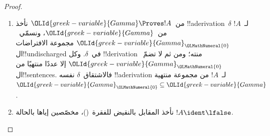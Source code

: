 \documentclass[../../../include/open-logic-section]{subfiles}
\begin{document}
\begin{proof}
  \begin{enumerate}
    \item من~$\OLId{greek-variable}{Gamma} \Proves !A$ نأخذ !!a{derivation}~$\delta$
      لـ~$!A$ من~$\OLId{greek-variable}{Gamma}$، ونسمّي~$\OLId{greek-variable}{Gamma}_\OLMathNumeral{0}$ مجموعة الافتراضات
      ال!!{undischarged} في~$\delta$. وكل !!{derivation} منته؛ ومن ثم
      لا تضمّ~$\OLId{greek-variable}{Gamma}_\OLMathNumeral{0}$ إلا عددًا منتهيًا من ال!!{sentence}s.
      فالاشتقاق~$\delta$ نفسه !!a{derivation} لـ~$!A$ من مجموعة
      منتهية~$\OLId{greek-variable}{Gamma}_\OLMathNumeral{0} \subseteq \OLId{greek-variable}{Gamma}$.
    \item نأخذ المقابل بالنقيض للفقرة~()، مخصّصين إياها بالحالة
      $!A \ident \lfalse$.
  \end{enumerate}
\end{proof}
\end{document}
